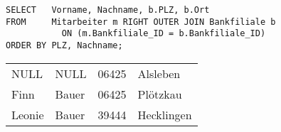           \begin{lstlisting}[language=ms_sql,caption={Der gleiche Right-Outer-Join in MS SQL Server},label=sql04_16]
SELECT   Vorname, Nachname, b.PLZ, b.Ort
FROM     Mitarbeiter m RIGHT OUTER JOIN Bankfiliale b
           ON (m.Bankfiliale_ID = b.Bankfiliale_ID)
ORDER BY PLZ, Nachname;
          \end{lstlisting}
          \begin{center}
            \begin{small}
              \tablehead{}
              \tabletail {
              }
              \begin{mssql}
                \begin{supertabular}{llll}
									NULL & NULL & 06425 & Alsleben \\
									Finn & Bauer & 06425 & Pl\"otzkau \\
									Leonie & Bauer & 39444 & Hecklingen \\
                \end{supertabular}
              \end{mssql}
            \end{small}
          \end{center}

